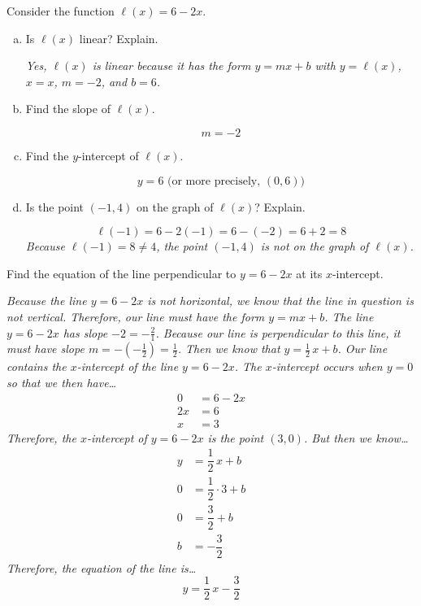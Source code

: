 \documentclass[12pt,letterpaper]{exam}
\begin{document}
\begin{questions}
\question[8] Consider the function $\ell(x)= 6 - 2x$. \pspace
	\begin{enumerate}[(a)]
	\item Is $\ell(x)$ linear? Explain. \pvspace{1.4cm}
	
	{\itshape Yes, $\ell(x)$ is linear because it has the form $y= mx + b$ with $y= \ell(x)$, $x= x$, $m= -2$, and $b= 6$.} \pvspace{1.4cm}
	
	\item Find the slope of $\ell(x)$. \pvspace{1.3cm}
	
		\[
		m= -2
		\] \pvspace{1.3cm}
	
	\item Find the $y$-intercept of $\ell(x)$. \pvspace{1.3cm}
	
		\[
		y= 6 \text{ (or more precisely, $(0, 6) )$}
		\] \pvspace{1.3cm}
	
	\item Is the point $(-1, 4)$ on the graph of $\ell(x)$? Explain. \pvspace{1.3cm}
	
		\[
		\ell(-1)= 6 - 2(-1)= 6 - (-2)= 6 + 2= 8
		\] \pspace
	{\itshape Because $\ell(-1)= 8 \neq 4$, the point $(-1, 4)$ is not on the graph of $\ell(x)$.}
	\end{enumerate}



\newpage



\question[6] Find the equation of the line perpendicular to $y= 6 - 2x$ at its $x$-intercept. \pspace

{\itshape Because the line $y= 6 - 2x$ is not horizontal, we know that the line in question is not vertical. Therefore, our line must have the form $y= mx + b$. The line $y= 6 - 2x$ has slope $-2= -\frac{2}{1}$. Because our line is perpendicular to this line, it must have slope $m= -\left(-\frac{1}{2}\right)= \frac{1}{2}$. Then we know that $y= \frac{1}{2}\,x + b$. Our line contains the $x$-intercept of the line $y= 6 - 2x$. The $x$-intercept occurs when $y= 0$ so that we then have\dots
	\[
	\begin{aligned}
	0&= 6 - 2x \\[0.3cm]
	2x&= 6 \\[0.3cm]
	x&= 3
	\end{aligned}
	\]
Therefore, the $x$-intercept of $y= 6 - 2x$ is the point $(3, 0)$. But then we know\dots
	\[
	\begin{aligned}
	y&= \dfrac{1}{2}\,x + b \\[0.3cm]
	0&= \dfrac{1}{2} \cdot 3 + b \\[0.3cm]
	0&= \dfrac{3}{2} + b \\[0.3cm]
	b&= -\dfrac{3}{2}
	\end{aligned}
	\]
Therefore, the equation of the line is\dots
	\[
	\boxed{y= \dfrac{1}{2}\,x - \dfrac{3}{2}}
	\]
}




\end{questions}
\end{document}
